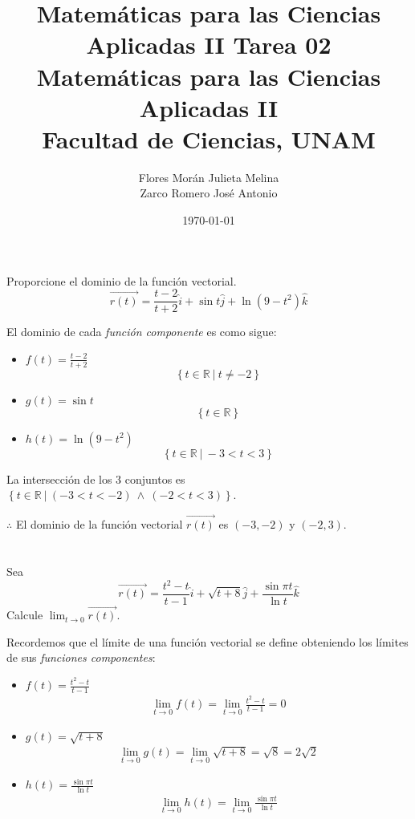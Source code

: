 \documentclass[12pt]{article}
\title{Matemáticas para las Ciencias Aplicadas II}
\title{
	\textbf{Tarea 02} \\
	\vspace{1ex}
	\large Matemáticas para las Ciencias Aplicadas II \\
	Facultad de Ciencias, UNAM}
\date{\today}
\author{Flores Morán Julieta Melina \\ Zarco Romero José Antonio}
\begin{document}
\maketitle

\section{}
Proporcione el dominio de la función vectorial.
\[
\vec{r(t)}
=
\frac{t-2}{t+2}\hat{i}
+
\sin{t}\hat{j}
+
\ln{(9-t^2)}\hat{k}
\]

El dominio de cada \textit{función componente} es como sigue:
\begin{itemize}[format=\textbf]

\item $f(t)=\frac{t-2}{t+2}$
  $$\left\{t \in \mathbb{R} ~|~ t \neq -2 \right\}$$

\item $g(t)=\sin{t}$
  $$\left\{t\in \mathbb{R} \right\}$$

\item $h(t)=\ln{(9-t^2)}$
  $$\left\{t\in \mathbb{R} ~|~ -3 < t < 3 \right\}$$

\end{itemize}
La intersección de los 3 conjuntos es $\left\{t\in \mathbb{R} ~|~ (-3<t<-2) ~ \land ~ (-2<t<3) \right\}$.

$\therefore$ El dominio de la función vectorial $\vec{r(t)}$ es $(-3,-2)$ y $(-2,3)$.


\section{}
Sea
\[
\vec{r(t)}
=
\frac{t^2-t}{t-1}\hat{i}
+
\sqrt{t+8}\hat{j}
+
\frac{\sin{\pi t}}{\ln{t}}\hat{k}
\]
Calcule $ \lim_{t \to 0} \vec{r(t)} $.

Recordemos que el límite de una función vectorial se define obteniendo los límites de sus \textit{funciones componentes}:
\begin{itemize}[format=\textbf]

\item $f(t)=\frac{t^2-t}{t-1}$
  \begin{align*}
    \lim_{t \to 0} f(t) = \lim_{t \to 0} \frac{t^2-t}{t-1} = 0
  \end{align*}

\item $g(t)=\sqrt{t+8}$
  \begin{align*}
    \lim_{t \to 0} g(t) = \lim_{t \to 0} \sqrt{t+8} = \sqrt{8} = 2\sqrt{2}
  \end{align*}

\item $h(t)=\frac{\sin{\pi t}}{\ln{t}}$
  \begin{align*}
    \lim_{t \to 0} h(t) = \lim_{t \to 0} \frac{\sin{\pi t}}{\ln{t}}
  \end{align*}

\end{itemize}
\end{document}

